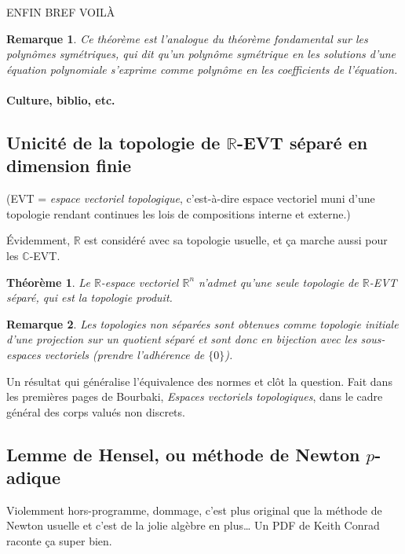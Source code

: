 \documentclass[a4paper, 11pt]{article}
\def\R{\mathbb{R}}
\def\C{\mathbb{C}}
\newtheorem*{theorem}{Théorème}
\newtheorem*{remark}{Remarque}
\begin{document}
ENFIN BREF VOILÀ

\begin{remark}
  Ce théorème est l'analogue du théorème fondamental sur les polynômes
  symétriques, qui dit qu'un polynôme symétrique en les solutions d'une équation
  polynomiale s'exprime comme polynôme en les coefficients de l'équation.
\end{remark}

\paragraph{Culture, biblio, etc.}

\newpage

\subsection{Unicité de la topologie de $\R$-EVT séparé en dimension finie}

(EVT = \emph{espace vectoriel topologique}, c'est-à-dire espace vectoriel muni
d'une topologie rendant continues les lois de compositions interne et externe.)

Évidemment, $\R$ est considéré avec sa topologie usuelle, et ça marche aussi
pour les $\C$-EVT.

\begin{theorem}
  Le $\R$-espace vectoriel $\R^n$ n'admet qu'une seule topologie de $\R$-EVT
  séparé, qui est la topologie produit.
\end{theorem}

\begin{remark}
  Les topologies non séparées sont obtenues comme topologie initiale d'une
  projection sur un quotient séparé et sont donc en bijection avec les
  sous-espaces vectoriels (prendre l'adhérence de $\{0\}$).
\end{remark}

Un résultat qui généralise l'équivalence des normes et clôt la question. Fait
dans les premières pages de Bourbaki, \emph{Espaces vectoriels topologiques},
dans le cadre général des corps valués non discrets.

\subsection{Lemme de Hensel, ou méthode de Newton $p$-adique}

Violemment hors-programme, dommage, c'est plus original que la méthode de Newton
usuelle et c'est de la jolie algèbre en plus… Un PDF de Keith Conrad raconte ça
super bien.
\end{document}
